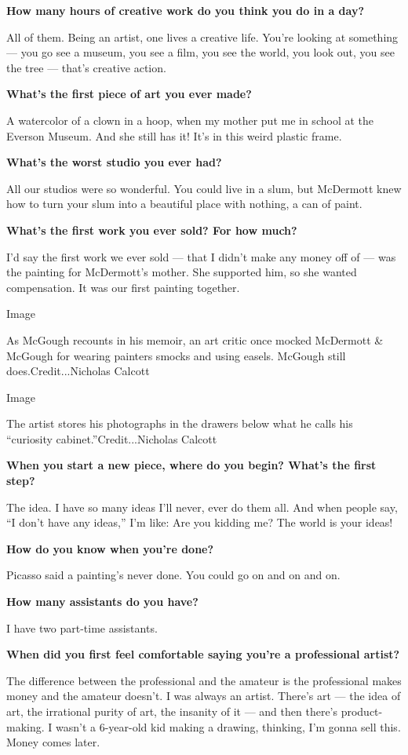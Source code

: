 \textbf{How many hours of creative work do you think you do in a day?}

All of them. Being an artist, one lives a creative life. You're looking
at something --- you go see a museum, you see a film, you see the world,
you look out, you see the tree --- that's creative action.

\textbf{What's the first piece of art you ever made?}

A watercolor of a clown in a hoop, when my mother put me in school at
the Everson Museum. And she still has it! It's in this weird plastic
frame.

\textbf{What's the worst studio you ever had?}

All our studios were so wonderful. You could live in a slum, but
McDermott knew how to turn your slum into a beautiful place with
nothing, a can of paint.

\textbf{What's the first work you ever sold? For how much?}

I'd say the first work we ever sold --- that I didn't make any money off
of --- was the painting for McDermott's mother. She supported him, so
she wanted compensation. It was our first painting together.

Image

As McGough recounts in his memoir, an art critic once mocked McDermott
\& McGough for wearing painters smocks and using easels. McGough still
does.Credit...Nicholas Calcott

Image

The artist stores his photographs in the drawers below what he calls his
``curiosity cabinet.''Credit...Nicholas Calcott

\textbf{When you start a new piece, where do you begin? What's the first
step?}

The idea. I have so many ideas I'll never, ever do them all. And when
people say, ``I don't have any ideas,'' I'm like: Are you kidding me?
The world is your ideas!

\textbf{How do you know when you're done?}

Picasso said a painting's never done. You could go on and on and on.

\textbf{How many assistants do you have?}

I have two part-time assistants.

\textbf{When did you first feel comfortable saying you're a professional
artist?}

The difference between the professional and the amateur is the
professional makes money and the amateur doesn't. I was always an
artist. There's art --- the idea of art, the irrational purity of art,
the insanity of it --- and then there's product-making. I wasn't a
6-year-old kid making a drawing, thinking, I'm gonna sell this. Money
comes later.

